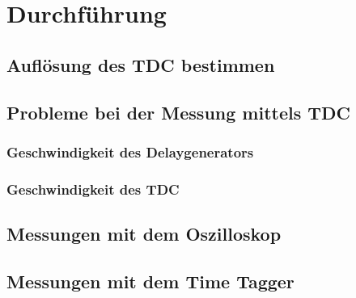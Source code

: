 \section{Durchführung}
\label{sec:Durchfuehrung}

\subsection{Auflösung des TDC bestimmen}
\label{sec:AufloesungTDC}

\subsection{Probleme bei der Messung mittels TDC}
\label{sec:ProblemeTDC}

\subsubsection{Geschwindigkeit des Delaygenerators}
\label{sec:Delaygenerator}

\subsubsection{Geschwindigkeit des TDC}
\label{sec:GeschwindigkeitTDC}

\subsection{Messungen mit dem Oszilloskop}
\label{sec:MessungenOszilloskop}

\subsection{Messungen mit dem Time Tagger}
\label{sec:MessungenTT}
